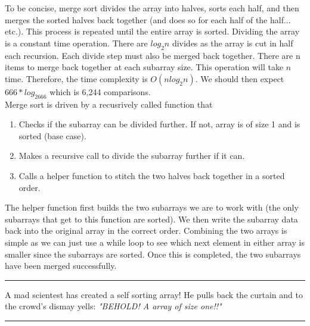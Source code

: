 \documentclass[letterpaper, 10pt]{article}
\begin{document}
To be concise, merge sort divides the array into halves, sorts each half, and then merges the sorted halves back together (and does so for each half of the half... etc.). This process is repeated until the entire array is sorted.
Dividing the array is a constant time operation. There are \(log_2n \) divides as the array is cut in half each recursion. Each divide step must also be merged back together. There are n items to merge back together at each subarray size. This operation will take $n$ time. Therefore, the time complexity is $O(nlog_2n)$. We should then expect $666*log_2666$ which is 6,244 comparisons.\\
\newline
Merge sort is driven by a recusrively called function that
\begin{enumerate}
    \item Checks if the subarray can be divided further. If not, array is of size 1 and is sorted (base case).
    \item Makes a recursive call to divide the subarray further if it can.
    \item Calls a helper function to stitch the two halves back together in a sorted order.
\end{enumerate}

The helper function first builds the two subarrays we are to work with (the only subarrays that get to this function are sorted). We then write the subarray data back into the original array in the correct order. Combining the two arrays is simple as we can just use a while loop to see which next element in either array is smaller since the subarrays are sorted. Once this is completed, the two subarrays have been merged successfully.

\hrule
\vspace{.25cm}
A mad scientest has created a self sorting array! He pulls back the curtain and to the crowd's dismay yells: \textit{"BEHOLD! A array of size one!!"}
\vspace{.25cm}
\hrule
\newpage
\end{document}
